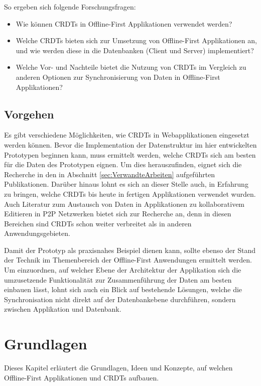 \documentclass[a4paper, 12pt]{scrreprt}
\begin{document}
So ergeben sich folgende Forschungsfragen:

\begin{itemize}
	\item Wie können \acp{CRDT} in Offline-First Applikationen verwendet werden?
	\item Welche \acp{CRDT} bieten sich zur Umsetzung von Offline-First Applikationen an, und wie werden diese in die Datenbanken (Client und Server) implementiert?
	\item Welche Vor- und Nachteile bietet die Nutzung von \acp{CRDT} im Vergleich zu anderen Optionen zur Synchronisierung von Daten in Offline-First Applikationen?
\end{itemize}

\section{Vorgehen}
Es gibt verschiedene Möglichkeiten, wie \acp{CRDT} in Webapplikationen eingesetzt werden können. Bevor die Implementation der Datenstruktur im hier entwickelten Prototypen beginnen kann, muss ermittelt werden, welche \acp{CRDT} sich am besten für die Daten des Prototypen eignen. Um dies herauszufinden, eignet sich die Recherche in den in Abschnitt \ref{sec:VerwandteArbeiten} aufgeführten Publikationen. Darüber hinaus lohnt es sich an dieser Stelle auch, in Erfahrung zu bringen, welche \acp{CRDT} bis heute in fertigen Applikationen verwendet wurden. Auch Literatur zum Austausch von Daten in Applikationen zu kollaborativem Editieren in \ac{P2P} Netzwerken bietet sich zur Recherche an, denn in diesen Bereichen sind \acp{CRDT} schon weiter verbreitet als in anderen Anwendungsgebieten.

Damit der Prototyp als praxisnahes Beispiel dienen kann, sollte ebenso der Stand der Technik im Themenbereich der Offline-First Anwendungen ermittelt werden. Um einzuordnen, auf welcher Ebene der Architektur der Applikation sich die umzusetzende Funktionalität zur Zusammenführung der Daten am besten einbauen lässt, lohnt sich auch ein Blick auf bestehende Lösungen, welche die Synchronisation nicht direkt auf der Datenbankebene durchführen, sondern zwischen Applikation und Datenbank.

\chapter{Grundlagen}
Dieses Kapitel erläutert die Grundlagen, Ideen und Konzepte, auf welchen Offline-First Applikationen und \acp{CRDT} aufbauen. 
\end{document}
